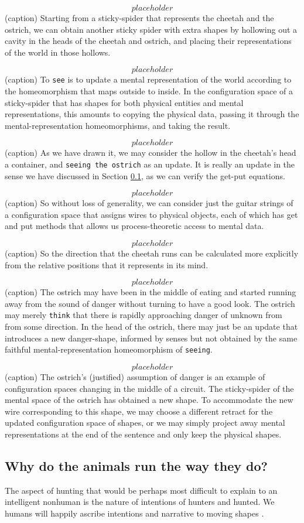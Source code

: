 \[placeholder\]
(caption) Starting from a sticky-spider that represents the cheetah and the ostrich, we can obtain another sticky spider with extra shapes by hollowing out a cavity in the heads of the cheetah and ostrich, and placing their representations of the world in those hollows.

\[placeholder\]
(caption) To \texttt{see} is to update a mental representation of the world according to the homeomorphism that maps outside to inside. In the configuration space of a sticky-spider that has shapes for both physical entities and mental representations, this amounts to copying the physical data, passing it through the mental-representation homeomorphisms, and taking the result.

\[placeholder\]
(caption) As we have drawn it, we may consider the hollow in the cheetah's head a container, and \texttt{seeing the ostrich} as an update. It is really an update in the sense we have discussed in Section \ref{}, as we can verify the get-put equations.

\[placeholder\]
(caption) So without loss of generality, we can consider just the guitar strings of a configuration space that assigns wires to physical objects, each of which has get and put methods that allows us process-theoretic access to mental data. 

\[placeholder\]
(caption) So the direction that the cheetah runs can be calculated more explicitly from the relative positions that it represents in its mind.

\[placeholder\]
(caption) The ostrich may have been in the middle of eating and started running away from the sound of danger without turning to have a good look. The ostrich may merely \texttt{think} that there is rapidly approaching danger of unknown from from some direction. In the head of the ostrich, there may just be an update that introduces a new danger-shape, informed by senses but not obtained by the same faithful mental-representation homeomorphism of \texttt{seeing}.

\[placeholder\]
(caption) The ostrich's (justified) assumption of danger is an example of configuration spaces changing in the middle of a circuit. The sticky-spider of the mental space of the ostrich has obtained a new shape. To accommodate the new wire corresponding to this shape, we may choose a different retract for the updated configuration space of shapes, or we may simply project away mental representations at the end of the sentence and only keep the physical shapes.

\subsection{Why do the animals run the way they do?}

The aspect of hunting that would be perhaps most difficult to explain to an intelligent nonhuman is the nature of intentions of hunters and hunted. We humans will happily ascribe intentions and narrative to moving shapes \citep{}.